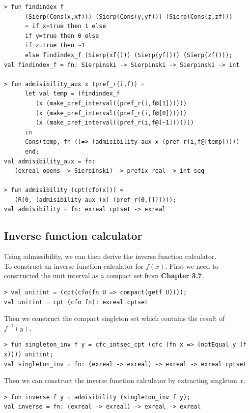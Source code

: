 \documentclass[12pt,twoside,notitlepage]{report}
\begin{document}
{
\begin{verbatim}
> fun findindex_f 
      (Sierp(Cons(x,xf))) (Sierp(Cons(y,yf))) (Sierp(Cons(z,zf)))
      = if x=true then 1 else 
      if y=true then 0 else 
      if z=true then ~1 
      else findindex_f (Sierp(xf())) (Sierp(yf())) (Sierp(zf()));
val findindex_f = fn: Sierpinski -> Sierpinski -> Sierpinski -> int

> fun admisibility_aux x (pref_r(i,f)) = 
      let val temp = (findindex_f 
         (x (make_pref_interval((pref_r(i,f@[1])))))
         (x (make_pref_interval((pref_r(i,f@[0]))))) 
         (x (make_pref_interval((pref_r(i,f@[~1]))))))
      in
      Cons(temp, fn ()=> (admisibility_aux x (pref_r(i,f@[temp]))))
      end;
val admisibility_aux = fn:
   (exreal opens -> Sierpinski) -> prefix_real -> int seq
   
> fun admisibility (cpt(cfo(x))) = 
   (R(0, (admisibility_aux (x) (pref_r(0,[])))));
val admisibility = fn: exreal cptset -> exreal
\end{verbatim}
} 


\subsection {Inverse function calculator}

Using admissibility, we can then derive the inverse function calculator. \\
To construct an inverse function calculator for $f(x)$. First we need to constructed the unit interval as a compact set from \textbf{Chapter 3.7},\\

{
\begin{verbatim}
> val unitint = (cpt(cfo(fn U => compact(getf U))));
val unitint = cpt (cfo fn): exreal cptset
\end{verbatim}
} 

Then we construct the compact singleton set which contains the result of $f^{-1}(y)$, \\

{
\begin{verbatim}
> fun singleton_inv f y = cfc_intsec_cpt (cfc (fn x => (notEqual y (f x)))) unitint;
val singleton_inv = fn: (exreal -> exreal) -> exreal -> exreal cptset
\end{verbatim}
} 

Then we can construct the inverse function calculator by extracting singleton $x$.

{
\begin{verbatim}
> fun inverse f y = admisibility (singleton_inv f y);
val inverse = fn: (exreal -> exreal) -> exreal -> exreal
\end{verbatim}
} 
\end{document}
